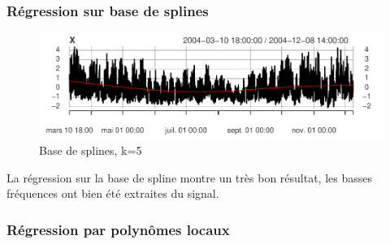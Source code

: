 \documentclass[
]{article}
\newenvironment{Shaded}{\begin{snugshade}}{\end{snugshade}}
\newcommand{\AttributeTok}[1]{\textcolor[rgb]{0.77,0.63,0.00}{#1}}
\newcommand{\DecValTok}[1]{\textcolor[rgb]{0.00,0.00,0.81}{#1}}
\newcommand{\FloatTok}[1]{\textcolor[rgb]{0.00,0.00,0.81}{#1}}
\newcommand{\FunctionTok}[1]{\textcolor[rgb]{0.00,0.00,0.00}{#1}}
\newcommand{\NormalTok}[1]{#1}
\newcommand{\OtherTok}[1]{\textcolor[rgb]{0.56,0.35,0.01}{#1}}
\newcommand{\SpecialCharTok}[1]{\textcolor[rgb]{0.00,0.00,0.00}{#1}}
\begin{document}
\hypertarget{ruxe9gression-sur-base-de-splines}{%
\subsubsection{Régression sur base de
splines}\label{ruxe9gression-sur-base-de-splines}}

\begin{Shaded}
\end{Shaded}

\begin{figure}

{\centering \includegraphics{STA202_report_files/figure-latex/splines-1} 

}

\caption{\label{fig:splines} Base de splines, k=5}\label{fig:splines}
\end{figure}

La régression sur la base de spline montre un très bon résultat, les
basses fréquences ont bien été extraites du signal.

\hypertarget{ruxe9gression-par-polynuxf4mes-locaux}{%
\subsubsection{Régression par polynômes
locaux}\label{ruxe9gression-par-polynuxf4mes-locaux}}

\begin{Shaded}
\end{Shaded}
\end{document}
